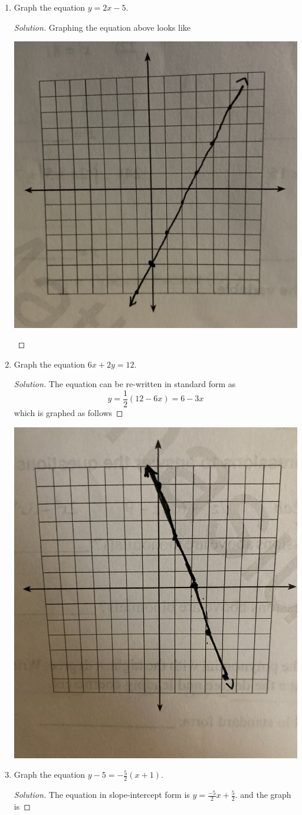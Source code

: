 \documentclass{article}
\begin{document}
\begin{enumerate}
\item Graph the equation \( y = 2x - 5 \).
    \begin{proof}[Solution]
    Graphing the equation above looks like
    \begin{center}
        \includegraphics[width = 0.5 \textwidth]{29}
    \end{center}
    \end{proof}
\item  Graph the equation \( 6x + 2y = 12\).
    \begin{proof}[Solution]
    The equation can be re-written in standard form as 
    \[ y = \frac{1}{2}(12 - 6x) = 6 - 3x\]
    which is graphed as follows
    \end{proof}
    \begin{center}
        \includegraphics[width=0.5 \textwidth]{30}
    \end{center}
\item Graph the equation \( y - 5 = -\frac{5}{2}(x+1)\).
    \begin{proof}[Solution]
    The equation in slope-intercept form is \( y = \frac{-5}{2}x + \frac{5}{2}.\) and the graph is 
    \end{proof}

\end{enumerate}
\end{document}
